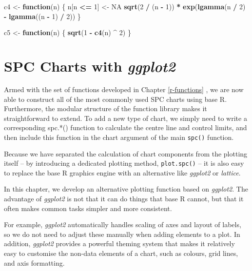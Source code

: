 \documentclass[
]{book}
\newenvironment{Shaded}{\begin{snugshade}}{\end{snugshade}}
\newcommand{\ConstantTok}[1]{\textcolor[rgb]{0.56,0.35,0.01}{#1}}
\newcommand{\ControlFlowTok}[1]{\textcolor[rgb]{0.13,0.29,0.53}{\textbf{#1}}}
\newcommand{\DecValTok}[1]{\textcolor[rgb]{0.00,0.00,0.81}{#1}}
\newcommand{\FunctionTok}[1]{\textcolor[rgb]{0.13,0.29,0.53}{\textbf{#1}}}
\newcommand{\NormalTok}[1]{#1}
\newcommand{\OtherTok}[1]{\textcolor[rgb]{0.56,0.35,0.01}{#1}}
\newcommand{\SpecialCharTok}[1]{\textcolor[rgb]{0.81,0.36,0.00}{\textbf{#1}}}
\begin{document}
\begin{Shaded}
\begin{Highlighting}[]
\NormalTok{c4 }\OtherTok{\textless{}{-}} \ControlFlowTok{function}\NormalTok{(n) \{}
\NormalTok{  n[n }\SpecialCharTok{\textless{}=} \DecValTok{1}\NormalTok{] }\OtherTok{\textless{}{-}} \ConstantTok{NA}
  \FunctionTok{sqrt}\NormalTok{(}\DecValTok{2} \SpecialCharTok{/}\NormalTok{ (n }\SpecialCharTok{{-}} \DecValTok{1}\NormalTok{)) }\SpecialCharTok{*} \FunctionTok{exp}\NormalTok{(}\FunctionTok{lgamma}\NormalTok{(n }\SpecialCharTok{/} \DecValTok{2}\NormalTok{) }\SpecialCharTok{{-}} \FunctionTok{lgamma}\NormalTok{((n }\SpecialCharTok{{-}} \DecValTok{1}\NormalTok{) }\SpecialCharTok{/} \DecValTok{2}\NormalTok{))}
\NormalTok{\}}

\NormalTok{c5 }\OtherTok{\textless{}{-}} \ControlFlowTok{function}\NormalTok{(n) \{}
  \FunctionTok{sqrt}\NormalTok{(}\DecValTok{1} \SpecialCharTok{{-}} \FunctionTok{c4}\NormalTok{(n) }\SpecialCharTok{\^{}} \DecValTok{2}\NormalTok{)}
\NormalTok{\}}
\end{Highlighting}
\end{Shaded}

\chapter{\texorpdfstring{SPC Charts with \emph{ggplot2}}{SPC Charts with ggplot2}}\label{ggplot}

Armed with the set of functions developed in Chapter \ref{r-functions} , we are now able to construct all of the most commonly used SPC charts using base R. Furthermore, the modular structure of the function library makes it straightforward to extend. To add a new type of chart, we simply need to write a corresponding spc.*() function to calculate the centre line and control limits, and then include this function in the chart argument of the main \texttt{spc()} function.

Because we have separated the calculation of chart components from the plotting itself -- by introducing a dedicated plotting method, \texttt{plot.spc()} -- it is also easy to replace the base R graphics engine with an alternative like \emph{ggplot2} or \emph{lattice}.

In this chapter, we develop an alternative plotting function based on \emph{ggplot2}. The advantage of \emph{ggplot2} is not that it can do things that base R cannot, but that it often makes common tasks simpler and more consistent.

For example, \emph{ggplot2} automatically handles scaling of axes and layout of labels, so we do not need to adjust these manually when adding elements to a plot. In addition, \emph{ggplot2} provides a powerful theming system that makes it relatively easy to customise the non-data elements of a chart, such as colours, grid lines, and axis formatting.
\end{document}

